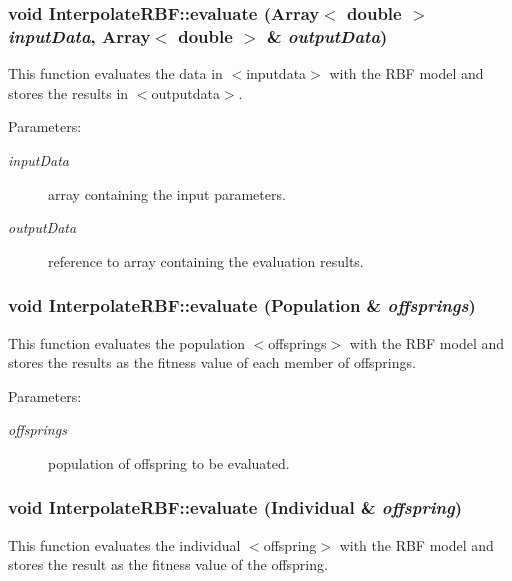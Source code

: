 \subsubsection{\setlength{\rightskip}{0pt plus 5cm}void Interpolate\-RBF::evaluate (Array$<$ double $>$ {\em input\-Data}, Array$<$ double $>$ \& {\em output\-Data})}\label{classInterpolateRBF_a5}


This function evaluates the data in $<$inputdata$>$ with the RBF model and stores the results in $<$outputdata$>$. 

\begin{Desc}
\item[Parameters:]
\begin{description}
\item[{\em input\-Data}]array containing the input parameters. \item[{\em output\-Data}]reference to array containing the evaluation results.\end{description}
\end{Desc}
\subsubsection{\setlength{\rightskip}{0pt plus 5cm}void Interpolate\-RBF::evaluate (Population \& {\em offsprings})}\label{classInterpolateRBF_a4}


This function evaluates the population $<$offsprings$>$ with the RBF model and stores the results as the fitness value of each member of offsprings. 

\begin{Desc}
\item[Parameters:]
\begin{description}
\item[{\em offsprings}]population of offspring to be evaluated.\end{description}
\end{Desc}
\subsubsection{\setlength{\rightskip}{0pt plus 5cm}void Interpolate\-RBF::evaluate (Individual \& {\em offspring})}\label{classInterpolateRBF_a3}


This function evaluates the individual $<$offspring$>$ with the RBF model and stores the result as the fitness value of the offspring. 


